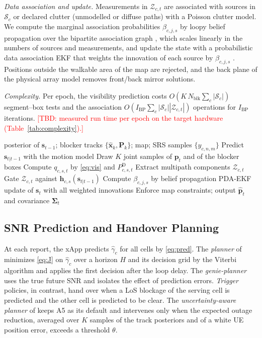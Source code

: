 \documentclass[journal]{IEEEtran}
\newcommand{\tbd}[1]{\textcolor{red}{[TBD: #1]}}
\newenvironment{proposed}{\color{propcol}}{}
\begin{document}
\begin{proposed}
\textit{Data association and update.} Measurements in
$\mathcal Z_{c,t}$ are associated with sources in $\mathcal S_c$ or
declared clutter (unmodelled or diffuse paths) with a Poisson clutter
model. We compute the marginal association probabilities
$\beta_{c,j,s}$ by loopy belief propagation over the bipartite
association graph \cite{williams2014bp,meyer2018message}, which scales
linearly in the numbers of sources and measurements, and update the
state with a probabilistic data association EKF that weights the
innovation of each source by $\beta_{c,j,s}$ \cite{barshalom2009pda}.
Positions outside the walkable area of the map are rejected, and the
back plane of the physical array model removes front/back mirror
solutions.

\textit{Complexity.} Per epoch, the visibility prediction costs
$O(K\,N_{\mathrm{blk}}\sum_c|\mathcal S_c|)$ segment--box tests and the
association $O(I_{\mathrm{BP}}\sum_c|\mathcal S_c||\mathcal Z_{c,t}|)$
operations for $I_{\mathrm{BP}}$ iterations. \tbd{measured run time per
epoch on the target hardware (Table~\ref{tab:complexity}).}

\begin{algorithm}[t]
\caption{Blockage-aware map-aided multipath tracker (one epoch)}
\label{alg:tracker}
\begin{algorithmic}[1]
\Require posterior of $\mathbf s_{t-1}$; blocker tracks $\{\hat{\mathbf x}_k,\mathbf P_k\}$; map; SRS samples $\{y_{c,n,m}\}$
\State Predict $\mathbf s_{t|t-1}$ with the motion model
\State Draw $K$ joint samples of $\mathbf p_t$ and of the blocker boxes
  \State Compute $q_{c,s,t}$ by \eqref{eq:vis} and $P^{\mathrm D}_{c,s,t}$
\EndFor
{}
  \State Extract multipath components $\mathcal Z_{c,t}$
  \State Gate $\mathcal Z_{c,t}$ against $\mathbf h_{c,s}(\mathbf s_{t|t-1})$
  \State Compute $\beta_{c,j,s}$ by belief propagation
\EndFor
\State PDA-EKF update of $\mathbf s_t$ with all weighted innovations
\State Enforce map constraints; output $\hat{\mathbf p}_t$ and covariance $\mathbf\Sigma_t$
\end{algorithmic}
\end{algorithm}
\end{proposed}

\subsection{SNR Prediction and Handover Planning}
At each report, the xApp predicts $\hat\gamma_c$ for all cells by
\eqref{eq:pred}. The \emph{planner} of \cite{natanzi2027wcncA} minimizes
\eqref{eq:J} on $\hat\gamma_c$ over a horizon $H$ and its decision grid
by the Viterbi algorithm and applies the first decision after the loop
delay. The \emph{genie-planner} uses the true future SNR and isolates
the effect of prediction errors. \emph{Trigger} policies, in contrast,
hand over when a LoS blockage of the serving cell is predicted and the
other cell is predicted to be clear. The \emph{uncertainty-aware
planner} of \cite{natanzi2027wcncA} keeps A5 as its default and
intervenes only when the expected outage reduction, averaged over $K$
samples of the track posteriors and of a white UE position error,
exceeds a threshold $\theta$.
\end{document}
